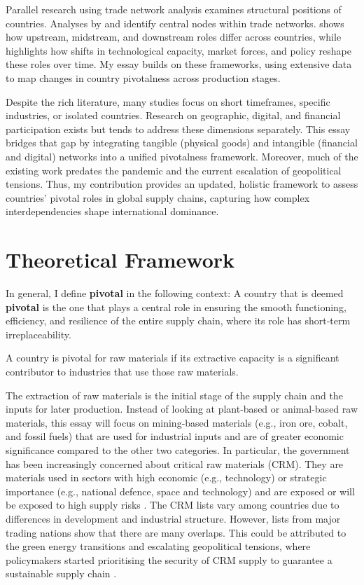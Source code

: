 \documentclass[11pt]{article}
\def\highlight#1#2{
	\begin{centering}
    
		\vspace{1.2ex}
		\begin{minipage}{0.8\linewidth}
			\begin{tcolorbox}[
				boxsep=3.3pt,
				boxrule=0.4pt,
				colback=white,
				colbacktitle=white,
				coltitle=black,
				colframe=black,
				title=\centering \textbf{#1},
			]
				\centering
				#2
			\end{tcolorbox}
		\end{minipage}
		\vspace{1.2ex}
        
	\end{centering}
}
\begin{document}
Parallel research using trade network analysis examines structural positions of countries. Analyses by \citet{de2014network} and \citet{deguchi2014hubs} identify central nodes within trade networks. \citet{cingolani2017} shows how upstream, midstream, and downstream roles differ across countries, while \citet{alves2022} highlights how shifts in technological capacity, market forces, and policy reshape these roles over time. My essay builds on these frameworks, using extensive data to map changes in country pivotalness across production stages.

Despite the rich literature, many studies focus on short timeframes, specific industries, or isolated countries. Research on geographic, digital, and financial participation exists but tends to address these dimensions separately. This essay bridges that gap by integrating tangible (physical goods) and intangible (financial and digital) networks into a unified pivotalness framework. Moreover, much of the existing work predates the pandemic and the current escalation of geopolitical tensions. Thus, my contribution provides an updated, holistic framework to assess countries’ pivotal roles in global supply chains, capturing how complex interdependencies shape international dominance.


\section{Theoretical Framework}
\label{sec:theory}

In general, I define \textbf{pivotal} in the following context: A country that is deemed \textbf{pivotal} is the one that plays a central role in ensuring the smooth functioning, efficiency, and resilience of the entire supply chain, where its role has short-term irreplaceability. 

\highlight{Pivotal Type 1: Raw Materials}{A country is pivotal for raw materials if its extractive capacity is a significant contributor to industries that use those raw materials.}

The extraction of raw materials is the initial stage of the supply chain and the inputs for later production. Instead of looking at plant-based or animal-based raw materials, this essay will focus on mining-based materials (e.g., iron ore, cobalt, and fossil fuels) that are used for industrial inputs and are of greater economic significance compared to the other two categories. In particular, the government has been increasingly concerned about critical raw materials (CRM). They are materials used in sectors with high economic (e.g., technology) or strategic importance (e.g., national defence, space and technology) and are exposed or will be exposed to high supply risks \citep{european2023}. The CRM lists vary among countries due to differences in development and industrial structure. However, lists from major trading nations show that there are many overlaps. This could be attributed to the green energy transitions and escalating geopolitical tensions, where policymakers started prioritising the security of CRM supply to guarantee a sustainable supply chain \citep{kowalski2023}.
 
\end{document}
